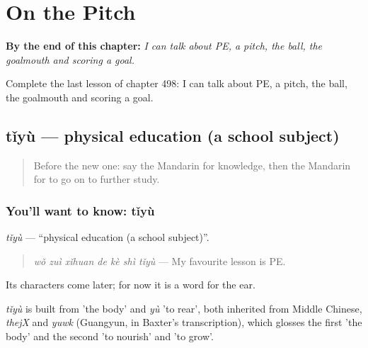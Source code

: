 
\chapter{On the Pitch}
\label{ch:zh-on-the-pitch}

\begin{chapteropening}
\textbf{By the end of this chapter:} \emph{I can talk about PE, a pitch, the ball, the goalmouth and scoring a goal.}

Complete the last lesson of chapter 498: I can talk about PE, a pitch, the ball, the goalmouth and scoring a goal.
\end{chapteropening}

\section[tǐyù]{tǐyù — physical education (a school subject)}

\label{lesson:ZH-C498-tiyu}



\begin{quote}
Before the new one: say the Mandarin for knowledge, then the Mandarin for to go on to further study.
\end{quote}

\subsection*{You'll want to know: tǐyù}
\emph{tǐyù} — \textquotedblleft{}physical education (a school subject)\textquotedblright{}.

\begin{quote}
\emph{wǒ zuì xǐhuan de kè shì tǐyù} — My favourite lesson is PE.
\end{quote}

Its characters come later; for now it is a word for the ear.

\begin{cousinweb}
\emph{tǐyù} is built from  'the body' and \emph{yù} 'to rear', both inherited from Middle Chinese, \emph{thejX} and \emph{yuwk} (Guangyun, in Baxter's transcription), which glosses the first 'the body' and the second 'to nourish' and 'to grow'.
\end{cousinweb}

